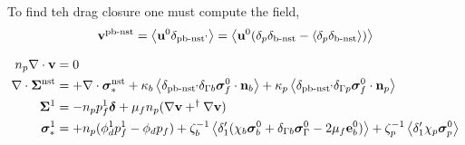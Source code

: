 \documentclass[12pt]{My_preprint}
\begin{document}
To find teh drag closure one must compute the field,
\begin{equation}
    \textbf{v}^\text{pb-nst}
    =
    \left<\textbf{u}^0 \delta_\text{pb-nst'}\right>
    =
    \left<\textbf{u}^0 (\delta_p \delta_\text{b-nst} - \left<\delta_p\delta_\text{b-nst}\right>)\right>
\end{equation}

\begin{align}
    n_p \mathbf{\nabla}\cdot \textbf{v} &= 0 \\
    \mathbf{\nabla}\cdot \bm\Sigma^\text{nst}
    &= 
    + \mathbf{\nabla}\cdot \bm\sigma^\text{nst}_*
    +\kappa_b  \left<\delta_\text{pb-nst'} \delta_{\Gamma b}  \bm\sigma_f^0 \cdot \textbf{n}_b \right>
    +\kappa_p  \left<\delta_\text{pb-nst'} \delta_{\Gamma p}  \bm\sigma_f^0 \cdot \textbf{n}_p \right>\\
    \bm\Sigma^1
    &=
    -n_p p_f^1\bm\delta
    + \mu_f n_p (\mathbf{\nabla} \textbf{v}+^\dagger \mathbf{\nabla} \textbf{v})\\
    \bm\sigma^1_*
    &=
    + n_p (\phi_d^1 p_f^1 - \phi_d p_f )
    +\zeta_b^{-1} \left<\delta_1' (\chi_b \bm\sigma_b^0 + \delta_{\Gamma b} \bm\sigma_\Gamma^0 - 2\mu_f \textbf{e}_b^0 )  \right>
    +\zeta_p^{-1} \left<\delta_1' \chi_p \bm\sigma_p^0 \right>
\end{align}


\appendix
\end{document}
